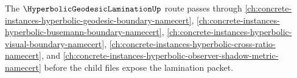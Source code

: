 The $\HyperbolicGeodesicLaminationUp$ route passes through \autoref{ch:concrete-instances-hyperbolic-geodesic-boundary-namecert}, \autoref{ch:concrete-instances-hyperbolic-busemann-boundary-namecert}, \autoref{ch:concrete-instances-hyperbolic-visual-boundary-namecert}, \autoref{ch:concrete-instances-hyperbolic-cross-ratio-namecert}, and \autoref{ch:concrete-instances-hyperbolic-observer-shadow-metric-namecert} before the child files expose the lamination packet.



